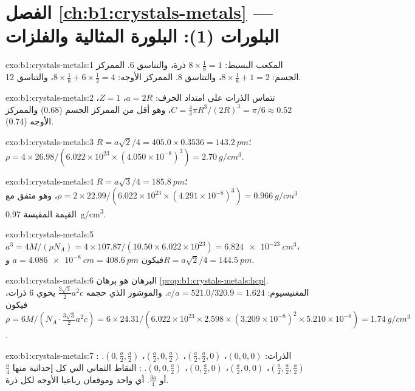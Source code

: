 \section*{الفصل \ref{ch:b1:crystals-metals} --- البلورات (1): البلورة المثالية والفلزات}

\begin{solution}{exo:b1:crystals-metals:1}
المكعب البسيط: $8 \times \frac18 = 1$ ذرة، والتناسق 6. الممركز الجسم: $8 \times
\frac18 + 1 = 2$، والتناسق 8. الممركز الأوجه: $8 \times \frac18 + 6 \times
\frac12 = 4$، والتناسق 12.
\end{solution}

\begin{solution}{exo:b1:crystals-metals:2}
تتماس الذرات على امتداد الحرف: $a = 2R$، $Z = 1$، $C = \frac43\pi R^3/(2R)^3
= \pi/6 \approx 0.52$، وهو أقل من الممركز الجسم (0.68) والممركز الأوجه (0.74).
\end{solution}

\begin{solution}{exo:b1:crystals-metals:3}
$R = a\sqrt2/4 = 405.0 \times 0.3536 = \qty{143.2}{pm}$؛
$\rho = 4 \times 26.98/(6.022 \times 10^{23} \times (4.050 \times
10^{-8})^3) = \qty{2.70}{g/cm^3}$.
\end{solution}

\begin{solution}{exo:b1:crystals-metals:4}
$R = a\sqrt3/4 = \qty{185.8}{pm}$؛ $\rho = 2 \times 22.99/(6.022 \times
10^{23} \times (4.291 \times 10^{-8})^3) = \qty{0.966}{g/cm^3}$، وهو
متفق مع القيمة المقيسة \qty{0.97}{g/cm^3}.
\end{solution}

\begin{solution}{exo:b1:crystals-metals:5}
$a^3 = 4M/(\rho N_A) = 4 \times 107.87/(10.50 \times 6.022 \times 10^{23}) =
\qty{6.824e-23}{cm^3}$، فيكون $a = \qty{4.086e-8}{cm} = \qty{408.6}{pm}$
و$R = a\sqrt2/4 = \qty{144.5}{pm}$.
\end{solution}

\begin{solution}{exo:b1:crystals-metals:6}
البرهان هو برهان \cref{prop:b1:crystals-metals:hcp}. المغنيسيوم:
$c/a = 521.0/320.9 = 1.624$. والموشور الذي حجمه
$\frac{3\sqrt3}{2}a^2c$ يحوي 6 ذرات، فيكون $\rho = 6M/(N_A \cdot
\frac{3\sqrt3}{2}a^2c) = 6 \times 24.31/(6.022 \times 10^{23} \times
2.598 \times (3.209 \times 10^{-8})^2 \times 5.210 \times 10^{-8}) =
\qty{1.74}{g/cm^3}$.
\end{solution}

\begin{solution}{exo:b1:crystals-metals:7}
الذرات: $(0,0,0)$، $(\frac a2,\frac a2,0)$، $(\frac a2,0,\frac a2)$،
$(0,\frac a2,\frac a2)$. : $(\frac a2,\frac a2,\frac a2)$،
$(\frac a2,0,0)$، $(0,\frac a2,0)$، $(0,0,\frac a2)$. : النقاط
الثماني التي كل إحداثية منها $\frac a4$ أو $\frac{3a}{4}$. أي
 واحد وموقعان رباعيا الأوجه لكل ذرة.
\end{solution}


